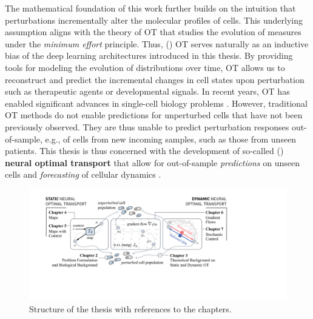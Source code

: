 The mathematical foundation of this work further builds on the intuition that perturbations incrementally alter the molecular profiles of cells. This underlying assumption aligns with the theory of \acrfull{OT} that studies the evolution of measures under the \emph{minimum effort} principle. Thus, () OT serves naturally as an inductive bias of the deep learning architectures introduced in this thesis.
By providing tools for modeling the evolution of distributions over time, OT allows us to reconstruct and predict the incremental changes in cell states upon perturbation such as therapeutic agents or developmental signals. 
In recent years, OT has enabled significant advances in single-cell biology problems \citep{schiebinger2019optimal, lavenant2021towards, demetci2022scot}. However, traditional OT methods do not enable predictions for unperturbed cells that have not been previously observed.
They are thus unable to predict perturbation responses out-of-sample, e.g., of cells from new incoming samples, such as those from unseen patients. 
This thesis is thus concerned with the development of so-called  () \textbf{neural optimal transport} that allow for out-of-sample \emph{predictions} on unseen cells and \emph{forecasting} of cellular dynamics \citep{makkuva2020optimal, tong2020trajectorynet,  korotin2021wasserstein, bunne2022proximal, bunne2022supervised, bunne2021learning}. \\

\begin{figure}[t]
  \includegraphics[width=\textwidth]{figures/fig_overview_thesis.pdf}
  \caption{Structure of the thesis with references to the chapters.}
  \label{fig:overview_thesis}
\end{figure}

